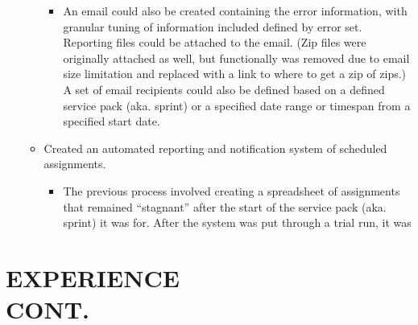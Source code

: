 \documentclass[margin]{res}
\begin{document}
\begin{resume}
\begin{itemize}
\begin{itemize}
\begin{itemize}
                  \item An email could also be created containing the error information, with 
                     granular tuning of information included defined by error set. Reporting 
                     files could be attached to the email. (Zip files were originally attached 
                     as well, but functionally was removed due to email size limitation and 
                     replaced with a link to where to get a zip of zips.) A set of email 
                     recipients could also be 
                     defined based on a defined service pack (aka. sprint) or a specified date range 
                     or timespan from a specified start date.
               \end{itemize}
            \item Created an automated reporting and notification system of scheduled assignments. 
               \begin{itemize}
                  \item The previous process involved creating a spreadsheet of assignments that 
                     remained ``stagnant'' after the start of the service pack (aka. sprint) it was 
                     for. After the system was put through a trial run, it was
               \end{itemize}
         \end{itemize}
         
\end{itemize}

   \section{EXPERIENCE \\ CONT.}


\end{resume}
\end{document}
